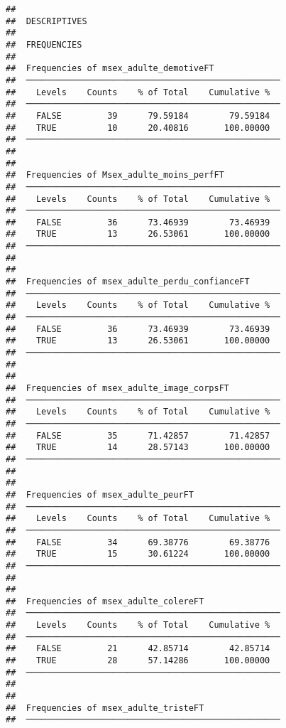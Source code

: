 \documentclass[
]{article}
\begin{document}
\begin{verbatim}
## 
##  DESCRIPTIVES
## 
##  FREQUENCIES
## 
##  Frequencies of msex_adulte_demotiveFT              
##  ────────────────────────────────────────────────── 
##    Levels    Counts    % of Total    Cumulative %   
##  ────────────────────────────────────────────────── 
##    FALSE         39      79.59184        79.59184   
##    TRUE          10      20.40816       100.00000   
##  ────────────────────────────────────────────────── 
## 
## 
##  Frequencies of Msex_adulte_moins_perfFT            
##  ────────────────────────────────────────────────── 
##    Levels    Counts    % of Total    Cumulative %   
##  ────────────────────────────────────────────────── 
##    FALSE         36      73.46939        73.46939   
##    TRUE          13      26.53061       100.00000   
##  ────────────────────────────────────────────────── 
## 
## 
##  Frequencies of msex_adulte_perdu_confianceFT       
##  ────────────────────────────────────────────────── 
##    Levels    Counts    % of Total    Cumulative %   
##  ────────────────────────────────────────────────── 
##    FALSE         36      73.46939        73.46939   
##    TRUE          13      26.53061       100.00000   
##  ────────────────────────────────────────────────── 
## 
## 
##  Frequencies of msex_adulte_image_corpsFT           
##  ────────────────────────────────────────────────── 
##    Levels    Counts    % of Total    Cumulative %   
##  ────────────────────────────────────────────────── 
##    FALSE         35      71.42857        71.42857   
##    TRUE          14      28.57143       100.00000   
##  ────────────────────────────────────────────────── 
## 
## 
##  Frequencies of msex_adulte_peurFT                  
##  ────────────────────────────────────────────────── 
##    Levels    Counts    % of Total    Cumulative %   
##  ────────────────────────────────────────────────── 
##    FALSE         34      69.38776        69.38776   
##    TRUE          15      30.61224       100.00000   
##  ────────────────────────────────────────────────── 
## 
## 
##  Frequencies of msex_adulte_colereFT                
##  ────────────────────────────────────────────────── 
##    Levels    Counts    % of Total    Cumulative %   
##  ────────────────────────────────────────────────── 
##    FALSE         21      42.85714        42.85714   
##    TRUE          28      57.14286       100.00000   
##  ────────────────────────────────────────────────── 
## 
## 
##  Frequencies of msex_adulte_tristeFT                
##  ────────────────────────────────────────────────── 

\end{verbatim}
\end{document}
